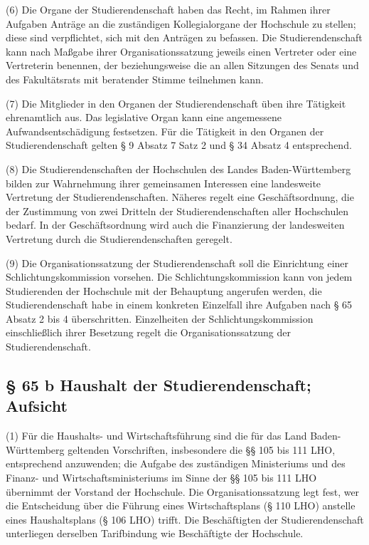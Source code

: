 \documentclass[
10pt,
a4paper,
twoside,								%
titlepage=false,							%
draft=false								%
]{scrartcl}
\begin{document}
(6) Die Organe der Studierendenschaft haben das Recht, im Rahmen ihrer Aufgaben Anträge an die zuständigen Kollegialorgane der Hochschule zu stellen; diese sind verpflichtet, sich mit den Anträgen zu befassen. Die Studierendenschaft kann nach Maßgabe ihrer Organisationssatzung jeweils einen Vertreter oder eine Vertreterin benennen, der beziehungsweise die an allen Sitzungen des Senats und des Fakultätsrats mit beratender Stimme teilnehmen kann.

(7) Die Mitglieder in den Organen der Studierendenschaft üben ihre Tätigkeit ehrenamtlich aus. Das legislative Organ kann eine angemessene Aufwandsentschädigung festsetzen. Für die Tätigkeit in den Organen der Studierendenschaft gelten § 9 Absatz 7 Satz 2 und § 34 Absatz 4 entsprechend.

(8) Die Studierendenschaften der Hochschulen des Landes Baden-Württemberg bilden zur Wahrnehmung ihrer gemeinsamen Interessen eine landesweite Vertretung der Studierendenschaften. Näheres regelt eine Geschäftsordnung, die der Zustimmung von zwei Dritteln der Studierendenschaften aller Hochschulen bedarf. In der Geschäftsordnung wird auch die Finanzierung der landesweiten Vertretung durch die Studierendenschaften geregelt.

(9) Die Organisationssatzung der Studierendenschaft soll die Einrichtung einer Schlichtungskommission vorsehen. Die Schlichtungskommission kann von jedem Studierenden der Hochschule mit der Behauptung angerufen werden, die Studierendenschaft habe in einem konkreten Einzelfall ihre Aufgaben nach § 65 Absatz 2 bis 4 überschritten. Einzelheiten der Schlichtungskommission einschließlich ihrer Besetzung regelt die Organisationssatzung der Studierendenschaft.


\subsection{§ 65 b Haushalt der Studierendenschaft; Aufsicht}

(1) Für die Haushalts- und Wirtschaftsführung sind die für das Land Baden-Württemberg geltenden Vorschriften, insbesondere die §§ 105 bis 111 LHO, entsprechend anzuwenden; die Aufgabe des zuständigen Ministeriums und des Finanz- und Wirtschaftsministeriums im Sinne der §§ 105 bis 111 LHO übernimmt der Vorstand der Hochschule. Die Organisationssatzung legt fest, wer die Entscheidung über die Führung eines Wirtschaftsplans (§ 110 LHO) anstelle eines Haushaltsplans (§ 106 LHO) trifft. Die Beschäftigten der Studierendenschaft unterliegen derselben Tarifbindung wie Beschäftigte der Hochschule.
\end{document}
